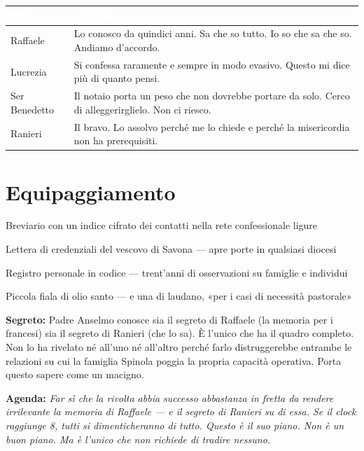 \begin{table}[h]
\centering\renewcommand{\arraystretch}{1.4}
\begin{tabularx}{\linewidth}{@{}L{2.6cm} X@{}}
  \toprule{}
  \textcolor{white}{\textbf{PG}} & \textcolor{white}{\textbf{Legame}} \\
  \midrule
  Raffaele & Lo conosco da quindici anni. Sa che so tutto. Io so che sa che so. Andiamo d'accordo. \\
  Lucrezia & Si confessa raramente e sempre in modo evasivo. Questo mi dice più di quanto pensi. \\
  Ser Benedetto & Il notaio porta un peso che non dovrebbe portare da solo. Cerco di alleggerirglielo. Non ci riesco. \\
  Ranieri & Il bravo. Lo assolvo perché me lo chiede e perché la misericordia non ha prerequisiti. \\
  \bottomrule
\end{tabularx}
\end{table}

\section*{Equipaggiamento}
\begin{goldlist}
  \item Breviario con un indice cifrato dei contatti nella rete confessionale ligure
  \item Lettera di credenziali del vescovo di Savona — apre porte in qualsiasi diocesi
  \item Registro personale in codice — trent'anni di osservazioni su famiglie e individui
  \item Piccola fiala di olio santo — e una di laudano, «per i casi di necessità pastorale»
\end{goldlist}


\begin{secretbox}
  \textbf{Segreto:} Padre Anselmo conosce sia il segreto di Raffaele (la memoria
  per i francesi) sia il segreto di Ranieri (che lo sa). È l'unico che ha il
  quadro completo. Non lo ha rivelato né all'uno né all'altro perché farlo
  distruggerebbe entrambe le relazioni su cui la famiglia Spinola poggia la
  propria capacità operativa. Porta questo sapere come un macigno.

  \medskip\noindent\textcolor{SecretRed}{\textbf{Agenda:}}
  \textit{Far sì che la rivolta abbia successo abbastanza in fretta da rendere
  irrilevante la memoria di Raffaele — e il segreto di Ranieri su di essa.
  Se il clock raggiunge 8, tutti si dimenticheranno di tutto. Questo è il
  suo piano. Non è un buon piano. Ma è l'unico che non richiede di tradire
  nessuno.}
\end{secretbox}

